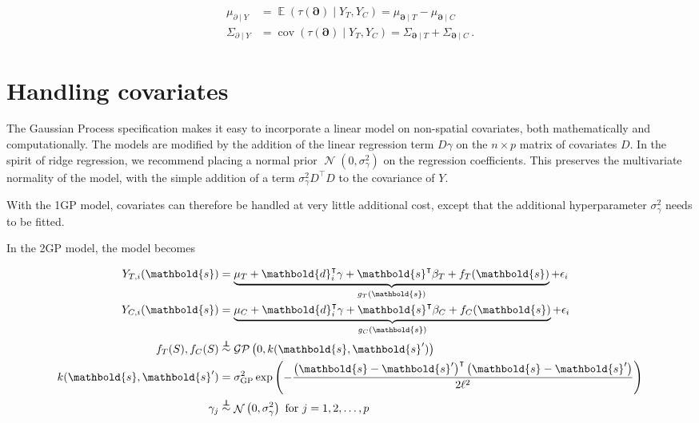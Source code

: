 \documentclass[letter]{article}
\newcommand{\genericdel}[3]{%
      \left#1#3\right#2
    }
\newcommand{\del}[1]{\genericdel(){#1}}
\DeclareMathOperator{\E}{\mathbb{E}}
\DeclareMathOperator{\cov}{{cov}}
\DeclareMathOperator{\normal}{\mathcal{N}}
\newcommand{\gp}{\mathcal{GP}}
\newcommand{\trans}{^{\intercal}}
\newcommand{\sigmaf}{\sigma_{\mathrm{GP}}}
\newcommand{\sigmagamma}{\sigma_{\gamma}}
\newcommand{\svec}{\mathbold{s}}
\newcommand{\dvec}{\mathbold{d}}
\newcommand{\indep}{\protect\mathpalette{\protect\independenT}{\perp}}
\def\independenT#1#2{\mathrel{\rlap{$#1#2$}\mkern2mu{#1#2}}}
\newcommand{\boundary}{\partial}
\newcommand{\sentinels}{\bm{\boundary}}
\begin{document}
\begin{equation}
\label{eq:postvar2gp}
\begin{split}
    \mu_{\boundary \mid Y} &= \E \del{\tau(\sentinels) \mid Y_T, Y_C} = \mu_{\sentinels \mid T} - \mu_{\sentinels \mid C} \\
    \Sigma_{\boundary \mid Y} &= \cov\del{\tau(\sentinels) \mid Y_T, Y_C} = \Sigma_{\sentinels \mid T} + \Sigma_{\sentinels \mid C}\,.
\end{split}\end{equation}
    


    	\section{Handling covariates}\label{handling-covariates}

The Gaussian Process specification makes it easy to incorporate a linear
model on non-spatial covariates, both mathematically and
computationally. The models are modified by the addition of the linear
regression term \(D \gamma\) on the \(n \times p\) matrix of covariates
\(D\). In the spirit of ridge regression, we recommend placing a normal
prior \(\normal(0,\sigmagamma^2)\) on the regression coefficients. This
preserves the multivariate normality of the model, with the simple
addition of a term \(\sigmagamma^2 D\trans D\) to the covariance of
\(Y\).

With the 1GP model, covariates can therefore be handled at very little
additional cost, except that the additional hyperparameter
\(\sigmagamma^2\) needs to be fitted.

In the 2GP model, the model becomes

\begin{equation}
\begin{split}
Y_{T,i}(\svec) &= \underbrace{\mu_T + \dvec_i\trans \gamma + \svec\trans\beta_T + f_T(\svec)}_{g_T(\svec)} + \epsilon_i \\
Y_{C,i}(\svec) &= \underbrace{\mu_C + \dvec_i\trans \gamma + \svec\trans\beta_C + f_C(\svec)}_{g_C(\svec)} + \epsilon_i \\
f_T(S), f_C(S) &\overset{\indep}{\sim} \gp\del{0, k(\svec, \svec')} \\
k(\svec,\svec') &= \sigmaf^2 \exp\del{ - \frac{\del{\svec-\svec'}\trans\del{\svec-\svec'}}{2 \ell^2}} \\
\gamma_j &\overset{\indep}{\sim} \normal\del{0,\sigmagamma^2}\text{ for }j=1,2,\ldots,p
\end{split}
\end{equation}
\end{document}
